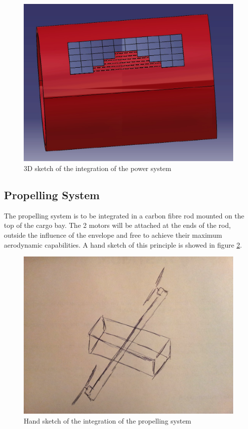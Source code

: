 \pagebreak

\begin{figure}[bht]
\centering
\includegraphics[scale=0.4]{figures/mesh.jpg}
\caption{3D sketch of the integration of the power system}
\label{fig:mesh}
\end{figure}

\subsection{Propelling System}

The propelling system is to be integrated in a carbon fibre rod mounted on the top of the cargo bay. The 2 motors will be attached at the ends of the rod, outside the influence of the envelope and free to achieve their maximum aerodynamic capabilities. A hand sketch of this principle is showed in figure \ref{fig:prop}.

\begin{figure}[h!]
\centering
\includegraphics[scale = 0.3]{figures/prop.jpg}
\caption{Hand sketch of the integration of the propelling system}
\label{fig:prop}
\end{figure}

